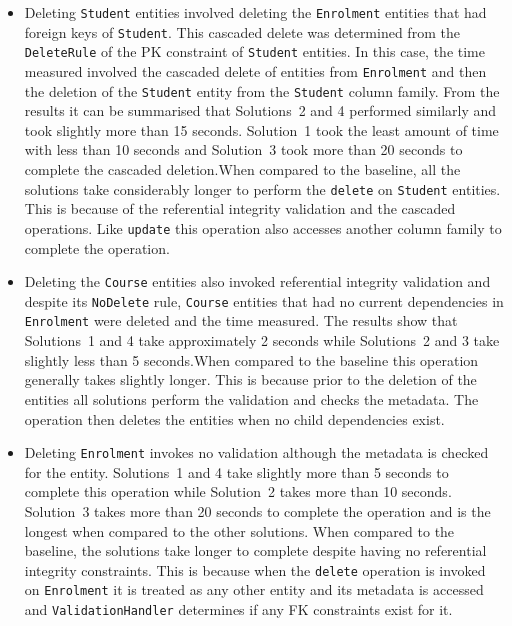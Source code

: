\begin{itemize}
  \item Deleting \texttt{Student} entities involved  deleting  the \texttt{Enrolment} 
  entities that had foreign keys of \texttt{Student}. This cascaded delete was
  determined from the \texttt{DeleteRule} of the \ac{PK} constraint of \texttt{Student} entities.
  In this case, the time measured involved the cascaded delete of
  entities from \texttt{Enrolment} and then the deletion of the \texttt{Student}
  entity from the \texttt{Student} column family. From the results it can be
  summarised that Solutions~2 and 4 performed similarly and took slightly more
  than 15 seconds. Solution~1 took the least amount of time with less than 10
  seconds and Solution~3 took more than 20 seconds to complete the cascaded
  deletion.When compared to the baseline, all the solutions take considerably
  longer to perform the \texttt{delete} on \texttt{Student} entities. This is
  because of the referential integrity validation and the cascaded operations.
  Like \texttt{update} this operation also accesses another column family to
  complete the operation.
  
  \item Deleting the \texttt{Course} entities also invoked referential
  integrity validation and despite its \texttt{NoDelete} rule, \texttt{Course}
  entities that had no current dependencies in \texttt{Enrolment} were deleted
  and the time measured. The results show that Solutions~1 and 4 take
  approximately 2 seconds while Solutions~2 and 3 take slightly less than 5
  seconds.When compared to the baseline this operation generally takes slightly
  longer. This is because prior to the deletion of the entities all solutions
  perform the validation and checks the metadata. The operation then deletes the
  entities when no child dependencies exist.
  
  \item Deleting \texttt{Enrolment} invokes no validation although the metadata
  is checked for the entity. Solutions~1 and 4 take slightly more than 5
  seconds to complete this operation while Solution~2 takes more than 10
  seconds. Solution~3 takes more than 20 seconds to complete the operation and
  is the longest when compared to the other solutions. When compared to the
  baseline, the solutions take longer to complete despite having no referential
  integrity constraints. This is because when the \texttt{delete} operation is
  invoked on \texttt{Enrolment} it is treated as any other entity and its
  metadata is accessed and \texttt{ValidationHandler} determines if any
  \ac{FK} constraints exist for it.
  
\end{itemize}

